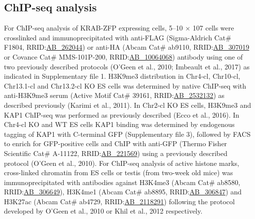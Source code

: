 \documentclass[11pt,a4paper]{article}
\begin{document}
\subsection{ChIP-seq analysis}

For ChIP-seq analysis of KRAB-ZFP expressing cells, 5–10 × 107 cells were crosslinked and immunoprecipitated with anti-FLAG (Sigma-Aldrich Cat\# F1804, RRID:\href{https://scicrunch.org/resolver/AB\_262044}{AB\_262044}) or anti-HA (Abcam Cat\# ab9110, RRID:\href{https://scicrunch.org/resolver/AB\_307019}{AB\_307019} or Covance Cat\# MMS-101P-200, RRID:\href{https://scicrunch.org/resolver/AB\_10064068}{AB\_10064068}) antibody using one of two previously described protocols (O'Geen et al., 2010; Imbeault et al., 2017) as indicated in Supplementary file 1. H3K9me3 distribution in Chr4-cl, Chr10-cl, Chr13.1-cl and Chr13.2-cl KO ES cells was determined by native ChIP-seq with anti-H3K9me3 serum (Active Motif Cat\# 39161, RRID:\href{https://scicrunch.org/resolver/AB\_2532132}{AB\_2532132}) as described previously (Karimi et al., 2011). In Chr2-cl KO ES cells, H3K9me3 and KAP1 ChIP-seq was performed as previously described (Ecco et al., 2016). In Chr4-cl KO and WT ES cells KAP1 binding was determined by endogenous tagging of KAP1 with C-terminal GFP (Supplementary file 3), followed by FACS to enrich for GFP-positive cells and ChIP with anti-GFP (Thermo Fisher Scientific Cat\# A-11122, RRID:\href{https://scicrunch.org/resolver/AB\_221569}{AB\_221569}) using a previously described protocol (O'Geen et al., 2010). For ChIP-seq analysis of active histone marks, cross-linked chromatin from ES cells or testis (from two-week old mice) was immunoprecipitated with antibodies against H3K4me3 (Abcam Cat\# ab8580, RRID:\href{https://scicrunch.org/resolver/AB\_306649}{AB\_306649}), H3K4me1 (Abcam Cat\# ab8895, RRID:\href{https://scicrunch.org/resolver/AB\_306847}{AB\_306847}) and H3K27ac (Abcam Cat\# ab4729, RRID:\href{https://scicrunch.org/resolver/AB\_2118291}{AB\_2118291}) following the protocol developed by O'Geen et al., 2010 or Khil et al., 2012 respectively.
\end{document}
